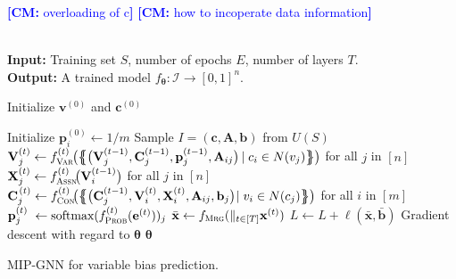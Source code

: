 \documentclass[11pt, DIV=12]{scrartcl}
\theoremstyle{definition}
\newcommand{\cI}{\ensuremath{{\mathcal I}}\xspace}
\renewcommand{\vec}[1]{\mathbf{#1}}
\newcommand{\cm}[1]{{{\textcolor{blue}{\textbf{[CM:} {#1}\textbf{]}}}}}
\begin{document}
\cm{overloading of c}
\cm{how to incoperate data information}


\begin{algorithm}[H]\mbox{\hfill}
	\\\textbf{Input:}  Training set $S$, number of epochs $E$, number of layers $T$.  \\
	\textbf{Output:} A trained model $f_{\boldsymbol{\theta}} \colon \cI \to [0,1]^n$.
	\begin{algorithmic}[1]
		\State Initialize $\vec{v}^{(0)}$ and $\vec{c}^{(0)}$

		\State Initialize $\vec{p}_i^{(0)} \leftarrow 1/m$
		\State Sample $I = (\vec{c}, \vec{A}, \vec{b})$ from $U(S)$ 
		\State $\vec{V}_j^{(t)} \leftarrow f_{\textsc{Var}}^{(t)} \hspace{-1pt} \big( \big\{ \hspace{-4.4pt} \big\{ \big( \vec{V}^{(t-1)}_j, \vec{C}^{(t-1)}_j, \vec{p}^{(t-1)}_j, \vec{A}_{ij} \big)\hspace{-1pt} \mid c_i \in N(v_j) \big\} \hspace{-4.4pt} \big\} \big)$ for all $j$ in $[n]$ 		
		\State $\vec{X}_j^{(t)} \leftarrow f_\textsc{Assn}^{(t)} \hspace{-2pt} \big(\vec{V}_i^{(t-1)} \big)$ for all $j$ in $[n]$ 
		\Statex
		\State $\vec{C}_j^{\hspace{1pt}(t)} \leftarrow f_\textsc{Con}^{(t)} \hspace{-2pt} \big( \big\{ \hspace{-4.4pt} \big\{ \big( \vec{C}^{(t-1)}_j, \vec{V}^{(t)}_i, \vec{X}^{(t)}_i, \vec{A}_{ij}, \vec{b}_j \big)\hspace{-2pt} \mid v_i \in N(c_j) \big\} \hspace{-4.4pt} \big\} \big)$ for all $i$ in $[m]$ 	
		\State $\vec{p}_{j}^{(t)} \hspace{3pt}\leftarrow \text{softmax}(f_\textsc{Prob}^{(t)}(\vec{e}^{(t)}))_{j}$
		\EndFor
		\State $\bar{\vec{x}} \leftarrow f_\textsc{Mrg}(\mathbin\Vert_{t \in [T]} \vec{x}^{(t)})$
		\State $L \leftarrow L + \ell(\vec{\bar{x}}, \vec{\bar b})$ 
		\State Gradient descent  with regard to $\boldsymbol{\theta}$
		\EndFor
		\State \Return $\boldsymbol{\theta}$
		
	\end{algorithmic}
	\caption{MIP-GNN for variable bias prediction.}
	\label{alg:as2}
\end{algorithm}
\end{document}
